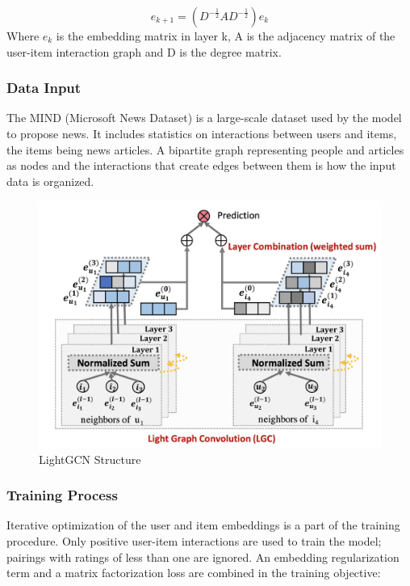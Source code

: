 \documentclass[9pt,twocolumn,twoside,lineno]{gsajnl}
\begin{document}
\[e_{k+1} = (D^{-\frac{1}{2}} A D^{-\frac{1}{2}}) e_k\]
Where $e_k$ is the embedding matrix in layer k, A is the adjacency matrix of the user-item interaction graph and D is the degree matrix.

\subsubsection{Data Input\newline}
The MIND (Microsoft News Dataset) is a large-scale dataset used by the model to propose news. It includes statistics on interactions between users and items, the items being news articles. A bipartite graph representing people and articles as nodes and the interactions that create edges between them is how the input data is organized.

\begin{figure}
    \centering
    \includegraphics[width=\linewidth]{material/4.png}
    \caption{LightGCN Structure}
    \label{fig:4}
\end{figure}

\subsubsection{Training Process\newline}
Iterative optimization of the user and item embeddings is a part of the training procedure. Only positive user-item interactions are used to train the model; pairings with ratings of less than one are ignored. An embedding regularization term and a matrix factorization loss are combined in the training objective:
\end{document}
